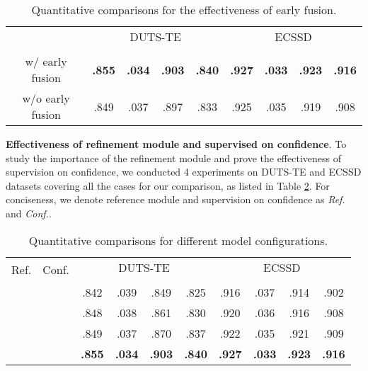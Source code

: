 \documentclass[10pt,twocolumn,letterpaper]{article}
\newcommand{\xmark}{\ding{55}}\newcommand{\cmark}{\ding{51}}
\begin{document}
\begin{table}[!h]
      \centering
	\setlength\tabcolsep{0pt}
	\caption{Quantitative comparisons for the effectiveness of early fusion.}
        \begin{tabular}{c|cccc|cccc} 
		\hline
		\multirow{2}{*}{} & \multicolumn{4}{c|}{DUTS-TE} & \multicolumn{4}{c}{ECSSD}  \\
		                           & \textbf{} & \textbf{} & \textbf{} & \textbf{}                & \textbf{} & \textbf{} & \textbf{} & \textbf{} \\ 
		\hline
		w/ early fusion        &\textbf{.855}   & \textbf{.034}  & \textbf{.903}  & \textbf{.840} & \textbf{.927} & \textbf{.033}  & \textbf{.923}  & \textbf{.916}    \\
		w/o early fusion      & .849               & .037                 & .897                & .833               & .925               & .035               & .919                & .908          \\
		\hline
	\end{tabular}
	\label{table:early_fusion}
\end{table}


\textbf{Effectiveness of refinement module and supervised on confidence}. To study the importance of the refinement module and prove the effectiveness of supervision on confidence, we conducted 4 experiments on DUTS-TE and ECSSD datasets covering all the cases for our comparison, as listed in Table \ref{table:ref_and_conf}. For conciseness, we denote reference module and supervision on confidence as \textit{Ref.} and \textit{Conf.}.


\begin{table}[!h]
      \centering
	\setlength\tabcolsep{1pt}
	\caption{Quantitative comparisons for different model configurations.}
        \begin{tabular}{c|c|cccc|cccc} 
		\hline
		\multirow{2}{*}{Ref.} & \multirow{2}{*}{Conf.}  & \multicolumn{4}{c|}{DUTS-TE} & \multicolumn{4}{c}{ECSSD}  \\
		                                  &                                        & \textbf{} & \textbf{} & \textbf{} & \textbf{}                & \textbf{} & \textbf{} & \textbf{} & \textbf{} \\ 
		\hline
		\xmark & \xmark   & .842   & .039  & .849  & .825  &  .916 &  .037   &  .914  &  .902    \\
		\cmark &\xmark    & .848   &  .038  & .861  &  .830 &  .920 &  .036   &  .916  &  .908    \\
		\xmark &\cmark    & .849   &  .037  & .870  &  .837 &  .922 &  .035   &  .921  &  .909    \\
		\cmark  &  \cmark &\textbf{.855}   & \textbf{.034}  & \textbf{.903}  & \textbf{.840} & \textbf{.927} & \textbf{.033}  & \textbf{.923}  & \textbf{.916}         \\
		\hline
	\end{tabular}
	\label{table:ref_and_conf}
\end{table}
\end{document}

